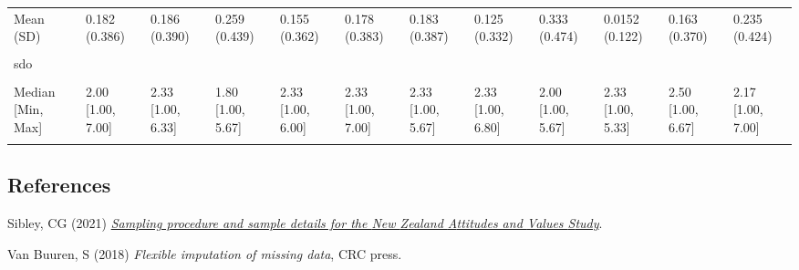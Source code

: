 \documentclass[
  single column]{article}
\newlength{\cslhangindent}
\newenvironment{CSLReferences}[2] %
 {\begin{list}{}{%
  \setlength{\itemindent}{0pt}
  \setlength{\leftmargin}{0pt}
  \setlength{\parsep}{0pt}
  \ifodd #1
   \setlength{\leftmargin}{\cslhangindent}
   \setlength{\itemindent}{-1\cslhangindent}
  \fi
  \setlength{\itemsep}{#2\baselineskip}}}
 {\end{list}}
\begin{document}
\begin{landscape}
\begin{longtable}[t]{llllllllllll}
\addlinespace
Mean (SD) & 0.182 (0.386) & 0.186 (0.390) & 0.259 (0.439) & 0.155 (0.362) & 0.178 (0.383) & 0.183 (0.387) & 0.125 (0.332) & 0.333 (0.474) & 0.0152 (0.122) & 0.163 (0.370) & 0.235 (0.424)\\
\cellcolor{gray!10}{Median [Min, Max]} & \cellcolor{gray!10}{0 [0, 1.00]} & \cellcolor{gray!10}{0 [0, 1.00]} & \cellcolor{gray!10}{0 [0, 1.00]} & \cellcolor{gray!10}{0 [0, 1.00]} & \cellcolor{gray!10}{0 [0, 1.00]} & \cellcolor{gray!10}{0 [0, 1.00]} & \cellcolor{gray!10}{0 [0, 1.00]} & \cellcolor{gray!10}{0 [0, 1.00]} & \cellcolor{gray!10}{0 [0, 1.00]} & \cellcolor{gray!10}{0 [0, 1.00]} & \cellcolor{gray!10}{0 [0, 1.00]}\\
sdo &  &  &  &  &  &  &  &  &  &  & \\
\cellcolor{gray!10}{Mean (SD)} & \cellcolor{gray!10}{2.16 (0.963)} & \cellcolor{gray!10}{2.47 (0.986)} & \cellcolor{gray!10}{1.99 (0.960)} & \cellcolor{gray!10}{2.38 (0.969)} & \cellcolor{gray!10}{2.37 (0.966)} & \cellcolor{gray!10}{2.41 (0.943)} & \cellcolor{gray!10}{2.45 (1.03)} & \cellcolor{gray!10}{2.30 (1.15)} & \cellcolor{gray!10}{2.44 (0.896)} & \cellcolor{gray!10}{2.52 (0.987)} & \cellcolor{gray!10}{2.26 (1.02)}\\
Median [Min, Max] & 2.00 [1.00, 7.00] & 2.33 [1.00, 6.33] & 1.80 [1.00, 5.67] & 2.33 [1.00, 6.00] & 2.33 [1.00, 7.00] & 2.33 [1.00, 5.67] & 2.33 [1.00, 6.80] & 2.00 [1.00, 5.67] & 2.33 [1.00, 5.33] & 2.50 [1.00, 6.67] & 2.17 [1.00, 7.00]\\
\addlinespace
\cellcolor{gray!10}{Missing} & \cellcolor{gray!10}{1 (0.0\%)} & \cellcolor{gray!10}{2 (0.1\%)} & \cellcolor{gray!10}{0 (0\%)} & \cellcolor{gray!10}{2 (0.1\%)} & \cellcolor{gray!10}{6 (0.2\%)} & \cellcolor{gray!10}{1 (0.1\%)} & \cellcolor{gray!10}{1 (0.7\%)} & \cellcolor{gray!10}{0 (0\%)} & \cellcolor{gray!10}{0 (0\%)} & \cellcolor{gray!10}{1 (0.2\%)} & \cellcolor{gray!10}{1 (0.1\%)}\\*

\end{longtable}

\endgroup{}


\end{landscape}

\newpage{}

\subsection*{References}\label{references}

\label{refs}
\begin{CSLReferences}{1}{0}
Sibley, CG (2021)
\emph{\href{https://doi.org/10.31234/osf.io/wgqvy}{Sampling procedure
and sample details for the {N}ew {Z}ealand {A}ttitudes and {V}alues
{S}tudy}}.

Van Buuren, S (2018) \emph{Flexible imputation of missing data}, CRC
press.

\end{CSLReferences}
\end{document}
